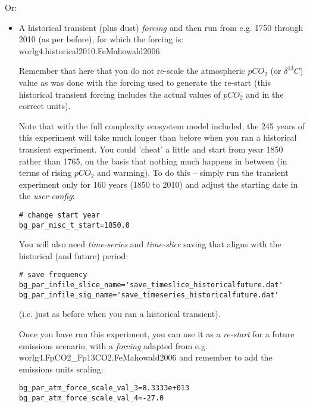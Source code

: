 \documentclass[11pt,fleqn]{book} %
\begin{document}
\begin{enumerate}[noitemsep]
\begin{itemize}[noitemsep]
\end{itemize}

\newpage
Or:

\begin{itemize}[noitemsep]
\item A historical transient (plus dust) \textit{forcing} and then run from e.g. 1750 through 2010 (as per before), for which the forcing is:
\vspace{1mm}
\\\textsf{\footnotesize worlg4.historical2010.FeMahowald2006}

\vspace{1mm}

\vspace{1mm}
Remember that here that you do not re-scale the atmospheric \(pCO_{2}\) (or \(\delta^{13}C\)) value as was done with the forcing used to generate the re-start (this historical transient forcing includes the actual values of  \(pCO_{2}\) and in the correct units). 

\vspace{1mm}
Note that with the full complexity ecosystem model included, the 245 years of this experiment will take much longer than before when you ran a historical transient experiment. You could 'cheat' a little and start from year 1850 rather than 1765, on the basis that nothing much happens in between (in terms of rising \(pCO_{2}\) and warming). To do this -- simply run the transient experiment only for 160 years (1850 to 2010) and adjust the starting date in the \textit{user-config}:
\vspace{-1mm}\small\begin{verbatim}
# change start year
bg_par_misc_t_start=1850.0
\end{verbatim}\normalsize\vspace{-1mm}

\vspace{1mm}
You will also need \textit{time-series} and \textit{time-slice} saving that aligns with the historical (and future) period:
\vspace{-1mm}\small\begin{verbatim}
# save frequency
bg_par_infile_slice_name='save_timeslice_historicalfuture.dat'
bg_par_infile_sig_name='save_timeseries_historicalfuture.dat'
\end{verbatim}\normalsize\vspace{-1mm}
(i.e. just as before when you ran a historical transient).

Once you have run this experiment, you can use it as a \textit{re-start} for a future emissions scenario,  with a \textit{forcing} adapted from e.g. \textsf{\footnotesize worlg4.FpCO2\_Fp13CO2.FeMahowald2006} and remember to add the emissions units scaling:
\vspace{-1mm}\small\begin{verbatim}
bg_par_atm_force_scale_val_3=8.3333e+013
bg_par_atm_force_scale_val_4=-27.0
\end{verbatim}\normalsize\vspace{-1mm}


\end{itemize}
\end{enumerate}
\end{document}
